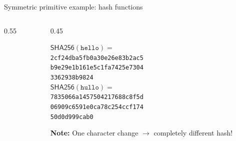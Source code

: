 \ifdefined\PRESENTATION\else\PassOptionsToClass{handout}{beamer}\fi\documentclass[aspectratio=169, lualatex]{beamer}
\begin{document}
\begin{frame}{Symmetric primitive example: hash functions}
	\begin{columns}[c]
		\begin{column}{0.55\textwidth}
		\end{column}
		\begin{column}{0.45\textwidth}
			\begin{tcolorbox}
				[colback=black!5!white,colframe=ciphergray] $\mathsf{SHA256}(\texttt{hello}) =$ \\ {\small\texttt{2cf24dba5fb0a30e26e83b2ac5}\\ \texttt{b9e29e1b161e5c1fa7425e7304}\\
					\texttt{3362938b9824}}\\[1em]
				$\mathsf{SHA256}(\texttt{hullo}) =$ \\ {\small\texttt{7835066a1457504217688c8f5d}\\
					\texttt{06909c6591e0ca78c254ccf174}\\ \texttt{50d0d999cab0}}
			\end{tcolorbox}
			\textcolor{cipherprimary}{\textbf{Note:} \small One character change $\rightarrow$
				completely different hash!}
		\end{column}
	\end{columns}
\end{frame}
\end{document}
